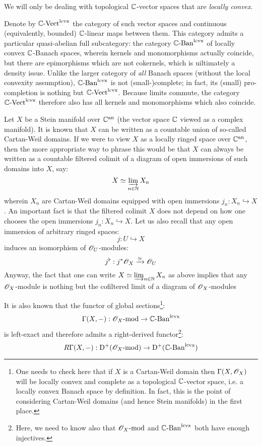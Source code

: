         \begin{remark}
            We will only be dealing with topological $\mathbb{C}$-vector spaces that are \textit{locally convex}.
            
            Denote by $\mathbb{C}\text{-}\mathrm{Vect}^{\mathrm{lcvx}}$ the category of such vector spaces and continuous (equivalently, bounded) $\mathbb{C}$-linear maps between them. This category admits a particular quasi-abelian full subcategory: the category $\mathbb{C}\text{-}\mathrm{Ban}^{\mathrm{lcvx}}$ of locally convex $\mathbb{C}$-Banach spaces, wherein kernels and monomorphisms actually coincide, but there are epimorphisms which are not cokernels, which is uiltimately a density issue. Unlike the larger category of \textit{all} Banach spaces (without the local convexity assumption), $\mathbb{C}\text{-}\mathrm{Ban}^{\mathrm{lcvx}}$ is not (small-)complete; in fact, its (small) pro-completion is nothing but $\mathbb{C}\text{-}\mathrm{Vect}^{\mathrm{lcvx}}$. Because limits commute, the category $\mathbb{C}\text{-}\mathrm{Vect}^{\mathrm{lcvx}}$ therefore also has all kernels and monomorphisms which also coincide.
    
            Let $X$ be a Stein manifold over $\mathbb{C}^{\mathrm{an}}$ (the vector space $\mathbb{C}$ viewed as a complex manifold). It is known that $X$ can be written as a countable union of so-called Cartan-Weil domains. If we were to view $X$ as a locally ringed space over $\mathbb{C}^{\mathrm{an}}$, then the more appropriate way to phrase this would be that $X$ can always be written as a countable filtered colimit of a diagram of open immersions of such domains into $X$, say:
                $$X \simeq \varinjlim_{n \in \mathbb{N}} X_n$$
            wherein $X_n$ are Cartan-Weil domains equipped with open immersions $j_n: X_n \hookrightarrow X$. An important fact is that the filtered colimit $X$ does not depend on how one chooses the open immersions $j_n: X_n \hookrightarrow X$. Let us also recall that any open immersion of arbitrary ringed spaces:
                $$j: U \hookrightarrow X$$
            induces an isomorphism of $\mathscr{O}_U$-modules:
                $$j^{\flat}: j^*\mathscr{O}_X \xrightarrow[]{\simeq} \mathscr{O}_U$$
            Anyway, the fact that one can write $X \simeq \varinjlim_{n \in \mathbb{N}} X_n$ as above implies that any $\mathscr{O}_X$-module is nothing but the cofiltered limit of a diagram of $\mathscr{O}_X$-modules 
                
            It is also known that the functor of global sections\footnote{One needs to check here that if $X$ is a Cartan-Weil domain then $\Gamma(X, \mathscr{O}_X)$ will be locally convex and complete as a topological $\mathbb{C}$-vector space, i.e. a locally convex Banach space by definition. In fact, this is the point of considering Cartan-Weil domains (and hence Stein manifolds) in the first place.}:
                $$\Gamma(X, -): \mathscr{O}_X\text{-}\mathrm{mod} \to \mathbb{C}\text{-}\mathrm{Ban}^{\mathrm{lcvx}}$$
            is left-exact and therefore admits a right-derived functor\footnote{Here, we need to know also that $\mathscr{O}_X\text{-}\mathrm{mod}$ and $\mathbb{C}\text{-}\mathrm{Ban}^{\mathrm{lcvx}}$ both have enough injectives.}:
                $$R\Gamma(X, -): \mathrm{D}^+(\mathscr{O}_X\text{-}\mathrm{mod}) \to \mathrm{D}^+(\mathbb{C}\text{-}\mathrm{Ban}^{\mathrm{lcvx}})$$
        \end{remark}
        
    \printbibliography

